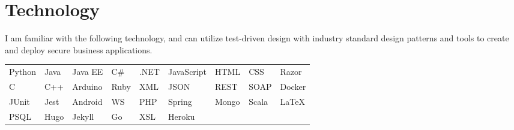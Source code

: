\documentclass[]{rcf_cv}
\begin{document}
	\section{Technology}
	
		I am familiar with the following technology, and can utilize test-driven design with industry standard design patterns and tools to create and deploy secure business applications.\\
	
	\begin{tabular}{l l l l l l l l l}
		Python & Java & Java EE & C\# & .NET & JavaScript & HTML & CSS & Razor \\
		
		C & C++ & Arduino & Ruby & XML & JSON & REST & SOAP & Docker \\
		
		JUnit & Jest & Android & WS & PHP & Spring & Mongo & Scala & \LaTeX \\
		
		PSQL & Hugo & Jekyll & Go & XSL & Heroku
		
	\end{tabular}
	
\end{document}
